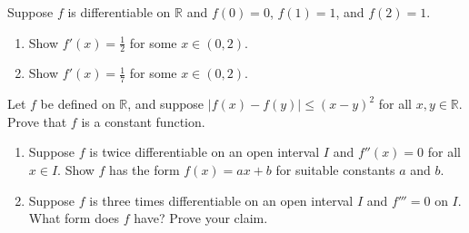 \documentclass{ximera}
\begin{document}
\begin{exercise}
    Suppose $f$ is differentiable on $\mathbb{R}$ and $f(0) = 0$, $f(1) = 1$, and $f(2) = 1$.  
    \begin{enumerate}
        \item Show $f'(x) = \frac12$ for some $x \in (0,2)$.
        \item Show $f'(x) = \frac17$ for some $x \in (0,2)$.
    \end{enumerate}
\end{exercise}

\begin{exercise}
    Let $f$ be defined on $\mathbb{R}$, and suppose $|f(x) - f(y)| \leq (x-y)^2$ for all $x,y \in \mathbb{R}$.  Prove that $f$ is a constant function.
\end{exercise}

\begin{exercise}
    \begin{enumerate}
        \item Suppose $f$ is twice differentiable on an open interval $I$ and $f''(x) = 0$ for all $x \in I$.  Show $f$ has the form $f(x) = ax+b$ for suitable constants $a$ and $b$.
        \item Suppose $f$ is three times differentiable on an open interval $I$ and $f''' =0$ on $I$.  What form does $f$ have?  Prove your claim.
     \end{enumerate}
    
    
\end{exercise}
\end{document}
